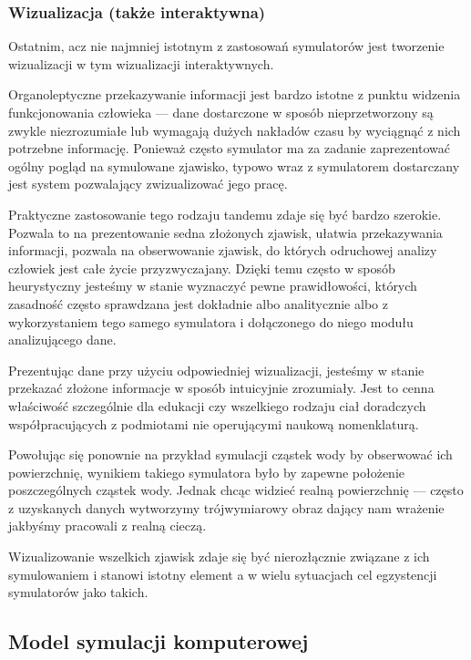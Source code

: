 \subsubsection{Wizualizacja (także interaktywna)}
\par{
Ostatnim, acz nie najmniej istotnym z zastosowań symulatorów jest tworzenie wizualizacji w tym wizualizacji interaktywnych.
}
\par{
Organoleptyczne przekazywanie informacji jest bardzo istotne z punktu widzenia funkcjonowania człowieka --- dane dostarczone w sposób nieprzetworzony są zwykle niezrozumiałe lub wymagają dużych nakładów czasu by wyciągnąć z nich potrzebne informację. Ponieważ często symulator ma za zadanie zaprezentować ogólny pogląd na symulowane zjawisko, typowo wraz z symulatorem dostarczany jest system pozwalający zwizualizować jego pracę.
}
\par{
Praktyczne zastosowanie tego rodzaju tandemu zdaje się być bardzo szerokie. Pozwala to na prezentowanie sedna złożonych zjawisk, ułatwia przekazywania informacji, pozwala na obserwowanie zjawisk, do których odruchowej analizy człowiek jest całe życie przyzwyczajany. Dzięki temu często w sposób heurystyczny jesteśmy w stanie wyznaczyć pewne prawidłowości, których zasadność często sprawdzana jest dokładnie albo analitycznie albo z wykorzystaniem tego samego symulatora i dołączonego do niego modułu analizującego dane.
}
\par{
Prezentując dane przy użyciu odpowiedniej wizualizacji, jesteśmy w stanie przekazać złożone informacje w sposób intuicyjnie zrozumiały. Jest to cenna właściwość szczególnie dla edukacji czy wszelkiego rodzaju ciał doradczych współpracujących z podmiotami nie operującymi naukową nomenklaturą.
}
\par{
Powołując się ponownie na przykład symulacji cząstek wody by obserwować ich powierzchnię, wynikiem takiego symulatora było by zapewne położenie poszczególnych cząstek wody. Jednak chcąc widzieć realną powierzchnię --- często z uzyskanych danych wytworzymy trójwymiarowy obraz dający nam wrażenie jakbyśmy pracowali z realną cieczą.
}
\par{
Wizualizowanie wszelkich zjawisk zdaje się być nierozłącznie związane z ich symulowaniem i stanowi istotny element a w wielu sytuacjach cel egzystencji symulatorów jako takich.
}

\subsection{Model symulacji komputerowej}
